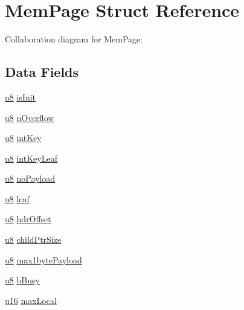 \hypertarget{struct_mem_page}{}\section{Mem\+Page Struct Reference}
\label{struct_mem_page}


Collaboration diagram for Mem\+Page\+:
\subsection*{Data Fields}
\begin{DoxyCompactItemize}
\item 
\hyperlink{sqlite3_8c_a74a0f6424ae628af25f23f0a35f6ead3}{u8} \hyperlink{struct_mem_page_a7318e02c1fe25199c0198f703c630337}{is\+Init}
\item 
\hyperlink{sqlite3_8c_a74a0f6424ae628af25f23f0a35f6ead3}{u8} \hyperlink{struct_mem_page_a178fc8eac371aba46bbdb4042d2b6040}{n\+Overflow}
\item 
\hyperlink{sqlite3_8c_a74a0f6424ae628af25f23f0a35f6ead3}{u8} \hyperlink{struct_mem_page_a0a18797b49604a12c9423fcd16a8a03c}{int\+Key}
\item 
\hyperlink{sqlite3_8c_a74a0f6424ae628af25f23f0a35f6ead3}{u8} \hyperlink{struct_mem_page_a4890917911842a160e87e23a59bb99c9}{int\+Key\+Leaf}
\item 
\hyperlink{sqlite3_8c_a74a0f6424ae628af25f23f0a35f6ead3}{u8} \hyperlink{struct_mem_page_a4453f74c1cd8ac8c8312c04ddb840094}{no\+Payload}
\item 
\hyperlink{sqlite3_8c_a74a0f6424ae628af25f23f0a35f6ead3}{u8} \hyperlink{struct_mem_page_a72158adbdb111e2d20c18fdbe71fbd28}{leaf}
\item 
\hyperlink{sqlite3_8c_a74a0f6424ae628af25f23f0a35f6ead3}{u8} \hyperlink{struct_mem_page_a41b31a2714c96b8661dd7d3beb33e502}{hdr\+Offset}
\item 
\hyperlink{sqlite3_8c_a74a0f6424ae628af25f23f0a35f6ead3}{u8} \hyperlink{struct_mem_page_aaa3442066b65e5022cc4aeb3e03e62ea}{child\+Ptr\+Size}
\item 
\hyperlink{sqlite3_8c_a74a0f6424ae628af25f23f0a35f6ead3}{u8} \hyperlink{struct_mem_page_ae108776c319d9bbb89d5f8ededa5635b}{max1byte\+Payload}
\item 
\hyperlink{sqlite3_8c_a74a0f6424ae628af25f23f0a35f6ead3}{u8} \hyperlink{struct_mem_page_a8eaec6ef6a9a6fbeb51396cae4427567}{b\+Busy}
\item 
\hyperlink{sqlite3_8c_a20f2299e322dcbde37cb07b16910b843}{u16} \hyperlink{struct_mem_page_ae520370dc0940464a186684b0a9b5113}{max\+Local}

\end{DoxyCompactItemize}
